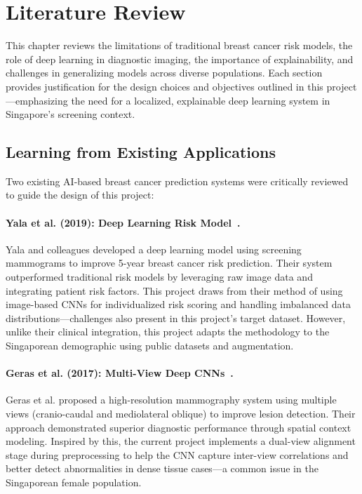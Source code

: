 \documentclass[12pt]{article}
\begin{document}
\newpage
\section{Literature Review}

This chapter reviews the limitations of traditional breast cancer risk models, the role of deep learning in diagnostic imaging, the importance of explainability, and challenges in generalizing models across diverse populations. Each section provides justification for the design choices and objectives outlined in this project—emphasizing the need for a localized, explainable deep learning system in Singapore's screening context.

\subsection{Learning from Existing Applications}

Two existing AI-based breast cancer prediction systems were critically reviewed to guide the design of this project:

\paragraph{Yala et al. (2019): Deep Learning Risk Model~\cite{1}.}
Yala and colleagues developed a deep learning model using screening mammograms to improve 5-year breast cancer risk prediction. Their system outperformed traditional risk models by leveraging raw image data and integrating patient risk factors. This project draws from their method of using image-based CNNs for individualized risk scoring and handling imbalanced data distributions—challenges also present in this project’s target dataset. However, unlike their clinical integration, this project adapts the methodology to the Singaporean demographic using public datasets and augmentation.

\paragraph{Geras et al. (2017): Multi-View Deep CNNs~\cite{8}.}
Geras et al. proposed a high-resolution mammography system using multiple views (cranio-caudal and mediolateral oblique) to improve lesion detection. Their approach demonstrated superior diagnostic performance through spatial context modeling. Inspired by this, the current project implements a dual-view alignment stage during preprocessing to help the CNN capture inter-view correlations and better detect abnormalities in dense tissue cases—a common issue in the Singaporean female population.
\end{document}
